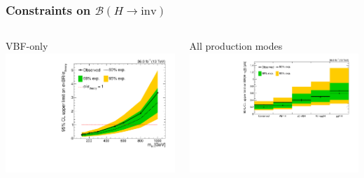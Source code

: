 \documentclass[aspectratio=169,xcolor=dvipsnames,,table,compress]{beamer}
\begin{document}
\begin{frame} \frametitle{Constraints on $\mathcal{B}(H\rightarrow\mathrm{inv})$}
  \vspace{-5mm}
  \begin{columns}[T]
    \begin{column}{0.4\textwidth}
      \centering
      VBF-only \\ 
        {\includegraphics[width=\textwidth]{../figures/vbf/fits/mhscan_ggf.pdf}}
    \end{column}
    \begin{column}{0.6\textwidth}
      \centering
      All production modes \\ 
        \includegraphics[width=\textwidth]{../figures/vbf/fits/comb.pdf}
    \end{column}
  \end{columns}
\end{frame}
 
\end{document}
